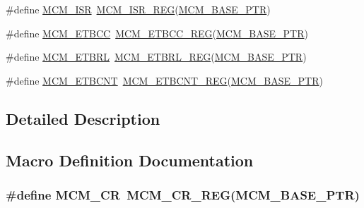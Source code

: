 \begin{DoxyCompactItemize}
\item 
\#define \hyperlink{group___m_c_m___register___accessor___macros_ga087580a63a0b37ef4983390e0d42452d}{M\+C\+M\+\_\+\+I\+SR}~\hyperlink{group___m_c_m___register___accessor___macros_ga7b1bf4ac9973931126074ef241b54d40}{M\+C\+M\+\_\+\+I\+S\+R\+\_\+\+R\+EG}(\hyperlink{group___m_c_m___peripheral_gad41e931f176c230831e3dbad45117841}{M\+C\+M\+\_\+\+B\+A\+S\+E\+\_\+\+P\+TR})
\item 
\#define \hyperlink{group___m_c_m___register___accessor___macros_gaaa981a4a4947bdf2556ffe864df81b8e}{M\+C\+M\+\_\+\+E\+T\+B\+CC}~\hyperlink{group___m_c_m___register___accessor___macros_gab88a04ecfdb01a192fb627f315a66abb}{M\+C\+M\+\_\+\+E\+T\+B\+C\+C\+\_\+\+R\+EG}(\hyperlink{group___m_c_m___peripheral_gad41e931f176c230831e3dbad45117841}{M\+C\+M\+\_\+\+B\+A\+S\+E\+\_\+\+P\+TR})
\item 
\#define \hyperlink{group___m_c_m___register___accessor___macros_gaabd766627a0d39299cadde42fbc3898d}{M\+C\+M\+\_\+\+E\+T\+B\+RL}~\hyperlink{group___m_c_m___register___accessor___macros_gab144bfdec0d6f7c4d122fa43df862204}{M\+C\+M\+\_\+\+E\+T\+B\+R\+L\+\_\+\+R\+EG}(\hyperlink{group___m_c_m___peripheral_gad41e931f176c230831e3dbad45117841}{M\+C\+M\+\_\+\+B\+A\+S\+E\+\_\+\+P\+TR})
\item 
\#define \hyperlink{group___m_c_m___register___accessor___macros_gad7fbf5aacd6ee04a2151f28b74e6bfe6}{M\+C\+M\+\_\+\+E\+T\+B\+C\+NT}~\hyperlink{group___m_c_m___register___accessor___macros_gab85d93512507faf0c706eba59d5533db}{M\+C\+M\+\_\+\+E\+T\+B\+C\+N\+T\+\_\+\+R\+EG}(\hyperlink{group___m_c_m___peripheral_gad41e931f176c230831e3dbad45117841}{M\+C\+M\+\_\+\+B\+A\+S\+E\+\_\+\+P\+TR})
\end{DoxyCompactItemize}


\subsection{Detailed Description}


\subsection{Macro Definition Documentation}
\subsubsection[{\texorpdfstring{M\+C\+M\+\_\+\+CR}{MCM_CR}}]{\setlength{\rightskip}{0pt plus 5cm}\#define M\+C\+M\+\_\+\+CR~{\bf M\+C\+M\+\_\+\+C\+R\+\_\+\+R\+EG}({\bf M\+C\+M\+\_\+\+B\+A\+S\+E\+\_\+\+P\+TR})}\hypertarget{group___m_c_m___register___accessor___macros_ga36dc3a2bb3893931d3c37cbe03661635}{}\label{group___m_c_m___register___accessor___macros_ga36dc3a2bb3893931d3c37cbe03661635}


